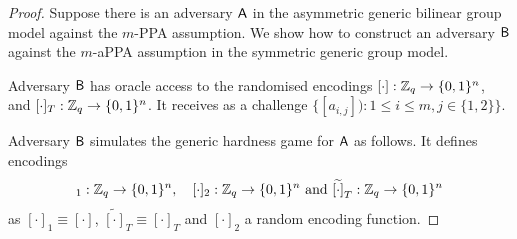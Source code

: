 \begin{proof}
Suppose there is an adversary $\mathsf{A}$  in the asymmetric generic bilinear group model against the $m$-PPA assumption.  We show how to construct an adversary $\mathsf{B}$ against the  $m$-aPPA assumption in the symmetric generic group model. 


Adversary $\mathsf{B}$ has oracle access to the randomised encodings $[\cdot]: \mathbb{Z}_q \to \{0,1\}^n$, 
and $[\cdot]_T: \mathbb{Z}_q \to \{0,1\}^n$. It receives as a challenge $\{ [a_{i,j}]):1\leq i \leq m, j\in\{1,2\}\}$.

Adversary $\mathsf{B}$ simulates the generic hardness game for $\mathsf{A}$ as follows. It defines encodings  
\begin{align*}
	[\cdot]_1: \Z_q \to \{0,1\}^n,\quad [\cdot]_2: \Z_q \to \{0,1\}^n \text{ and }\widetilde{[\cdot]}_T: \Z_q \to \{0,1\}^n 
\end{align*}
as $[\cdot]_1\equiv [\cdot]$, $\widetilde{[\cdot]}_T\equiv [\cdot]_T$ and $[\cdot]_2$ a random encoding function.
%

\end{proof}
